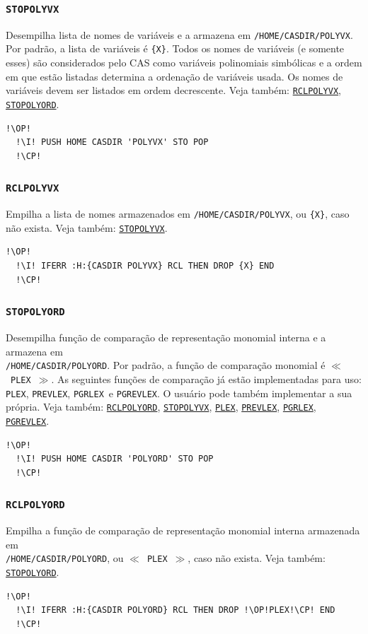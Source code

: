 \documentclass[12pt,a4paper]{report}
\newcommand{\kwd}[1]{\texttt{\textcolor{keyword}{#1}}}
\newcommand{\I}{\enspace\textcolor{indent}\vrule\hspace{2pt}}
\newcommand{\STOPOLYVX}{\kwd{STOPOLYVX}}   %
\newcommand{\RCLPOLYVX}{\kwd{RCLPOLYVX}}   %
\newcommand{\STOPOLYORD}{\kwd{STOPOLYORD}}   %
\newcommand{\RCLPOLYORD}{\kwd{RCLPOLYORD}}   %
\newcommand{\PLEX}{\kwd{PLEX}}   %
\newcommand{\PREVLEX}{\kwd{PREVLEX}}   %
\newcommand{\PGRLEX}{\kwd{PGRLEX}}   %
\newcommand{\PGREVLEX}{\kwd{PGREVLEX}}   %
\newcommand{\OP}{\kwd{$\ll$}}   %
\newcommand{\CP}{\kwd{$\gg$}}   %
\numberwithin{theorem}{chapter}
\begin{document}
\subsubsection{\STOPOLYVX}\label{STOPOLYVX}
Desempilha lista de nomes de variáveis ​​e a armazena em
\texttt{/HOME/CASDIR/POLYVX}.  Por padrão, a lista de variáveis ​​é
\texttt{\{X\}}.  Todos os nomes de variáveis ​​(e somente esses) são
considerados pelo CAS como variáveis polinomiais simbólicas e a ordem
em que estão listadas determina a ordenação de variáveis usada.  Os
nomes de variáveis ​​devem ser listados em ordem decrescente.  Veja
também: \hyperref[RCLPOLYVX]{\RCLPOLYVX},
\hyperref[STOPOLYORD]{\STOPOLYORD}.
\begin{lstlisting}[language=userrpl]
  !\OP!
  !\I! PUSH HOME CASDIR 'POLYVX' STO POP
  !\CP!
\end{lstlisting}

\subsubsection{\RCLPOLYVX}\label{RCLPOLYVX}
Empilha a lista de nomes armazenados em \texttt{/HOME/CASDIR/POLYVX},
ou \texttt{\{X\}}, caso não exista.  Veja também:
\hyperref[STOPOLYVX]{\STOPOLYVX}.
\begin{lstlisting}[language=userrpl]
  !\OP!
  !\I! IFERR :H:{CASDIR POLYVX} RCL THEN DROP {X} END
  !\CP!
\end{lstlisting}

\subsubsection{\STOPOLYORD}\label{STOPOLYORD}
Desempilha função de comparação de representação monomial interna e a
armazena em \\ \texttt{/HOME/CASDIR/POLYORD}.  Por padrão, a função de
comparação monomial é \OP\ \PLEX\ \CP.  As seguintes funções de
comparação já estão implementadas para uso: \PLEX, \PREVLEX,
\PGRLEX\ e \PGREVLEX.  O usuário pode também implementar a sua
própria.  Veja também: \hyperref[RCLPOLYORD]{\RCLPOLYORD},
\hyperref[STOPOLYVX]{\STOPOLYVX}, \hyperref[PLEX]{\PLEX},
\hyperref[PREVLEX]{\PREVLEX}, \hyperref[PGRLEX]{\PGRLEX},
\hyperref[PGREVLEX]{\PGREVLEX}.
\begin{lstlisting}[language=userrpl]
  !\OP!
  !\I! PUSH HOME CASDIR 'POLYORD' STO POP
  !\CP!
\end{lstlisting}

\subsubsection{\RCLPOLYORD}\label{RCLPOLYORD}
Empilha a função de comparação de representação monomial interna
armazenada em \\ \texttt{/HOME/CASDIR/POLYORD}, ou \OP\ \PLEX\ \CP,
caso não exista.  Veja também: \hyperref[STOPOLYORD]{\STOPOLYORD}.
\begin{lstlisting}[language=userrpl]
  !\OP!
  !\I! IFERR :H:{CASDIR POLYORD} RCL THEN DROP !\OP!PLEX!\CP! END
  !\CP!
\end{lstlisting}
\end{document}
